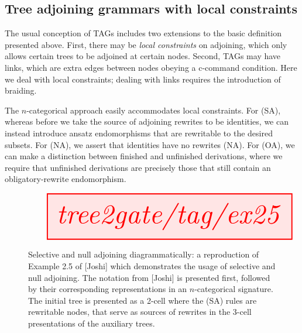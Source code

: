 \subsection{Tree adjoining grammars with local constraints}


The usual conception of TAGs includes two extensions to the basic definition presented above. First, there may be \emph{local constraints} on adjoining, which only allows certain trees to be adjoined at certain nodes. Second, TAGs may have links, which are extra edges between nodes obeying a c-command condition. Here we deal with local constraints; dealing with links requires the introduction of braiding.

The $n$-categorical approach easily accommodates local constraints. For (SA), whereas before we take the source of adjoining rewrites to be identities, we can instead introduce ansatz endomorphisms that are rewritable to the desired subsets. For (NA), we assert that identities have no rewrites (NA). For (OA), we can make a distinction between finished and unfinished derivations, where we require that unfinished derivations are precisely those that still contain an obligatory-rewrite endomorphism.

\begin{figure}[h!]
\centering
\[\resizebox{\textwidth}{!}{\tikzfig{tree2gate/tag/ex25}}\]
\caption{
Selective and null adjoining diagrammatically: a reproduction of Example 2.5 of [Joshi] which demonstrates the usage of selective and null adjoining. The notation from [Joshi] is presented first, followed by their corresponding representations in an $n$-categorical signature. The initial tree is presented as a 2-cell where the (SA) rules are rewritable nodes, that serve as sources of rewrites in the 3-cell presentations of the auxiliary trees.
}
\end{figure}

